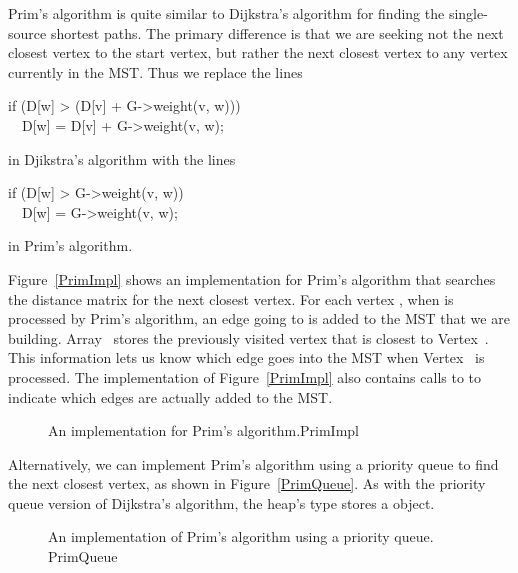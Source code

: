 Prim's algorithm is quite similar to Dijkstra's algorithm for finding
the single-source shortest
paths.
The primary difference is that we are seeking not the next closest
vertex to the start vertex, but rather the next closest vertex to any
vertex currently in the MST.
Thus we replace the lines

\begin{progenv}
if (D[w] > (D[v] + G->weight(v, w)))\\
\hspace*{0.00in}\ \ D[w] = D[v] + G->weight(v, w);
\end{progenv}

\noindent in Djikstra's algorithm with the lines

\begin{progenv}
if (D[w] > G->weight(v, w))\\
\hspace*{0.00in}\ \ D[w] = G->weight(v, w);
\end{progenv}

\noindent in Prim's algorithm.

Figure~\ref{PrimImpl} shows an implementation for Prim's algorithm
that searches the distance matrix for the next closest vertex.
For each vertex , when  is processed by Prim's
algorithm, an edge going to  is added to the MST that we are
building.
Array~ stores the previously visited vertex that is
closest to Vertex~.
This information lets us know which edge goes into the MST when
Vertex~ is processed.
The implementation of Figure~\ref{PrimImpl} also contains calls to
 to indicate which edges are actually added to the
MST.

\begin{figure}
\vspace{-\bigskipamount}
{An implementation for Prim's algorithm.}{PrimImpl}
\end{figure}

Alternatively, we can implement Prim's algorithm using a priority
queue to find the next closest vertex, as
shown in Figure~\ref{PrimQueue}.
As with the priority queue version of Dijkstra's algorithm, the heap's
 type stores a  object.

\begin{figure}
\vspace{-\bigskipamount}
{An implementation of Prim's algorithm using a priority queue.}
{PrimQueue}
\end{figure}

